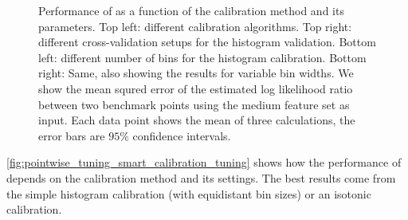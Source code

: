 \begin{figure}
  \caption{Performance of  as a function of the
    calibration method and its parameters. Top left: different
    calibration algorithms. Top right: different cross-validation
    setups for the histogram validation. Bottom left: different number
    of bins for the histogram calibration. Bottom right: Same, also
    showing the results for variable bin widths. We show the mean
    squred error of the estimated log likelihood ratio between two
    benchmark points using the medium feature set as input. Each data
    point shows the mean of three calculations, the error bars are
    $95\%$ confidence intervals.}
  \label{fig:pointwise_tuning_smart_calibration_tuning}
\end{figure}

\autoref{fig:pointwise_tuning_smart_calibration_tuning} shows how the
performance of  depends on the calibration method and
its settings. The best results come from the simple histogram
calibration (with equidistant bin sizes) or an isotonic calibration.


